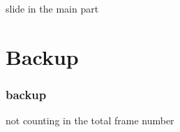 \documentclass[t]{beamer}
\begin{document}
    \begin{frame}
        slide in the main part
    \end{frame}

    \appendix
    \section*{Backup}

    \begin{frame}
        \frametitle{backup}
        not counting in the total frame number
    \end{frame}
\end{document}
